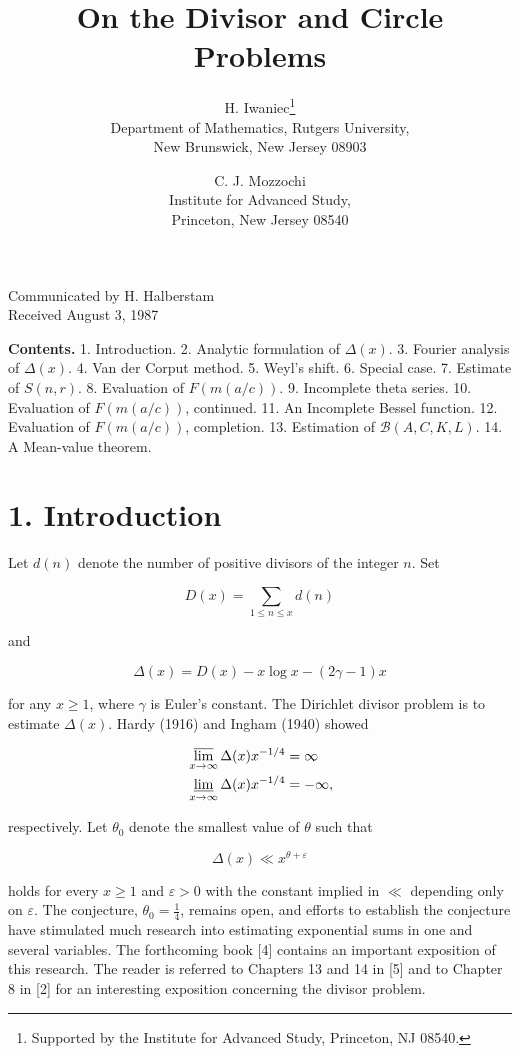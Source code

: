 \documentclass[10pt]{article}
\title{On the Divisor and Circle Problems}
\author{%
  H. Iwaniec\thanks{Supported by the Institute for Advanced Study, Princeton, NJ 08540.}\\
  Department of Mathematics, Rutgers University,\\
  New Brunswick, New Jersey 08903
  \and
  C. J. Mozzochi\\
  Institute for Advanced Study,\\
  Princeton, New Jersey 08540}
\date{}
\begin{document}
\maketitle

\begin{center}
Communicated by H. Halberstam\\
Received August 3, 1987
\end{center}

\noindent\textbf{Contents.}
1. Introduction. 2. Analytic formulation of $\Delta(x)$.
3. Fourier analysis of $\Delta(x)$. 4. Van der Corput method.
5. Weyl's shift. 6. Special case. 7. Estimate of $S(n,r)$.
8. Evaluation of $F(m(a/c))$. 9. Incomplete theta series.
10. Evaluation of $F(m(a/c))$, continued.
11. An Incomplete Bessel function.
12. Evaluation of $F(m(a/c))$, completion.
13. Estimation of $\mathscr{B}(A,C,K,L)$.
14. A Mean-value theorem.

\section*{1. Introduction}
Let $d(n)$ denote the number of positive divisors of the integer $n$. Set

$$
D(x)=\sum_{1 \leqslant n \leqslant x} d(n)
$$

and

$$
\Delta(x)=D(x)-x \log x-(2\gamma-1)x
$$

for any $x \geqslant 1$, where $\gamma$ is Euler's constant. The Dirichlet divisor problem is to estimate $\Delta(x)$. Hardy (1916) and Ingham (1940) showed

$$
\begin{aligned}
& \varlimsup_{x\to\infty} \Delta(x)x^{-1/4}=\infty \\
& \varliminf_{x\to\infty} \Delta(x)x^{-1/4}=-\infty,
\end{aligned}
$$

respectively. Let $\theta_{0}$ denote the smallest value of $\theta$ such that

\begin{equation*}
\Delta(x) \ll x^{\theta+\varepsilon} \tag{1.1}
\end{equation*}

holds for every $x \geqslant 1$ and $\varepsilon>0$ with the constant implied in $\ll$ depending only on $\varepsilon$. The conjecture, $\theta_{0}=\frac{1}{4}$, remains open, and efforts to establish the conjecture have stimulated much research into estimating exponential sums in one and several variables. The forthcoming book [4] contains an important exposition of this research. The reader is referred to Chapters 13 and 14 in [5] and to Chapter 8 in [2] for an interesting exposition concerning the divisor problem.
\end{document}
